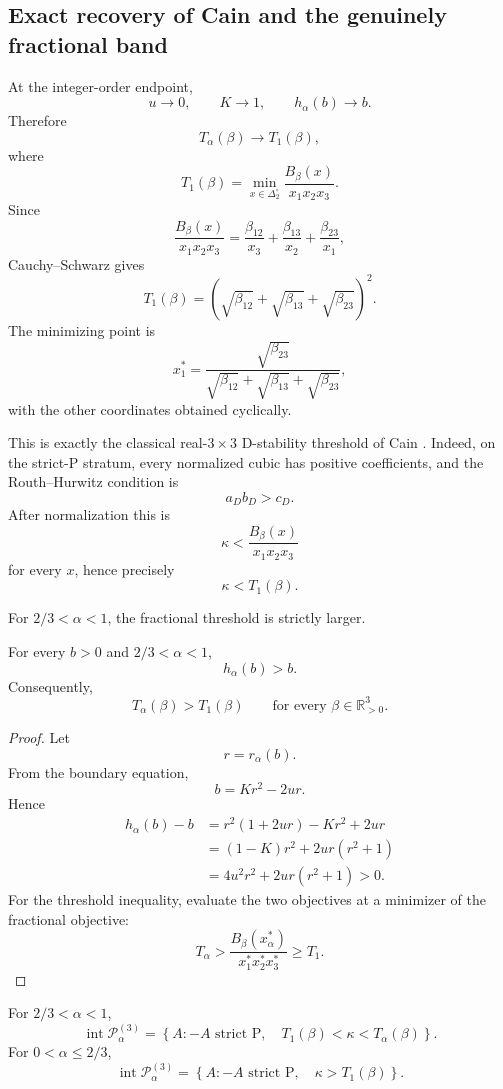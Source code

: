 \subsection{Exact recovery of Cain and the genuinely fractional band}

At the integer-order endpoint,
\[
u\to0,
\qquad
K\to1,
\qquad
h_\alpha(b)\to b.
\]
Therefore
\[
T_\alpha(\beta)\to T_1(\beta),
\]
where
\[
T_1(\beta)
=
\min_{x\in\Delta_2^\circ}
\frac{B_\beta(x)}{x_1x_2x_3}.
\]
Since
\[
\frac{B_\beta(x)}{x_1x_2x_3}
=
\frac{\beta_{12}}{x_3}
+
\frac{\beta_{13}}{x_2}
+
\frac{\beta_{23}}{x_1},
\]
Cauchy--Schwarz gives
\[
\boxed{
T_1(\beta)
=
\left(
\sqrt{\beta_{12}}
+
\sqrt{\beta_{13}}
+
\sqrt{\beta_{23}}
\right)^2.
}
\]
The minimizing point is
\[
x_1^*
=
\frac{\sqrt{\beta_{23}}}
{\sqrt{\beta_{12}}+\sqrt{\beta_{13}}+\sqrt{\beta_{23}}},
\]
with the other coordinates obtained cyclically.

This is exactly the classical real-\(3\times3\) D-stability threshold of Cain \citep{Cain1976}. Indeed, on the strict-P stratum, every normalized cubic has positive coefficients, and the Routh--Hurwitz condition is
\[
a_Db_D>c_D.
\]
After normalization this is
\[
\kappa
<
\frac{B_\beta(x)}{x_1x_2x_3}
\]
for every \(x\), hence precisely
\[
\kappa<T_1(\beta).
\]

For \(2/3<\alpha<1\), the fractional threshold is strictly larger.

\begin{lemma}
\label{lem:Talpha-gt-T1}
For every \(b>0\) and \(2/3<\alpha<1\),
\[
h_\alpha(b)>b.
\]
Consequently,
\[
T_\alpha(\beta)>T_1(\beta)
\qquad
\text{for every }\beta\in\mathbb R_{>0}^3.
\]
\end{lemma}

\begin{proof}
Let
\[
r=r_\alpha(b).
\]
From the boundary equation,
\[
b=Kr^2-2ur.
\]
Hence
\[
\begin{aligned}
h_\alpha(b)-b
&=
r^2(1+2ur)-Kr^2+2ur\\
&=
(1-K)r^2+2ur(r^2+1)\\
&=
4u^2r^2+2ur(r^2+1)>0.
\end{aligned}
\]
For the threshold inequality, evaluate the two objectives at a minimizer of the fractional objective:
\[
T_\alpha
>
\frac{B_\beta(x_\alpha^*)}{x_1^*x_2^*x_3^*}
\ge
T_1.
\]
\end{proof}

\begin{corollary}
\label{cor:exact-band}
For \(2/3<\alpha<1\),
\[
\boxed{
\operatorname{int}\mathcal P_\alpha^{(3)}
=
\left\{
A:
-A\text{ strict P},
\quad
T_1(\beta)<\kappa<T_\alpha(\beta)
\right\}.
}
\]
For \(0<\alpha\le2/3\),
\[
\boxed{
\operatorname{int}\mathcal P_\alpha^{(3)}
=
\left\{
A:
-A\text{ strict P},
\quad
\kappa>T_1(\beta)
\right\}.
}
\]
\end{corollary}

